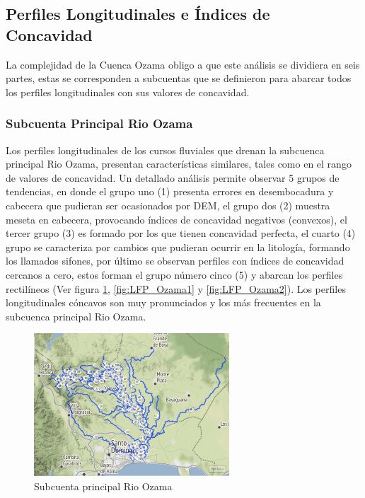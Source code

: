 \documentclass[11pt,]{article}
\begin{document}
\subsection{Perfiles Longitudinales e Índices de
Concavidad}\label{perfiles-longitudinales-e-uxedndices-de-concavidad}

La complejidad de la Cuenca Ozama obligo a que este análisis se
dividiera en seis partes, estas se corresponden a subcuentas que se
definieron para abarcar todos los perfiles longitudinales con sus
valores de concavidad.

\subsubsection{Subcuenta Principal Rio
Ozama}\label{subcuenta-principal-rio-ozama}

Los perfiles longitudinales de los cursos fluviales que drenan la
subcuenca principal Rio Ozama, presentan características similares,
tales como en el rango de valores de concavidad. Un detallado análisis
permite observar 5 grupos de tendencias, en donde el grupo uno (1)
presenta errores en desembocadura y cabecera que pudieran ser
ocasionados por DEM, el grupo dos (2) muestra meseta en cabecera,
provocando índices de concavidad negativos (convexos), el tercer grupo
(3) es formado por los que tienen concavidad perfecta, el cuarto (4)
grupo se caracteriza por cambios que pudieran ocurrir en la litología,
formando los llamados sifones, por último se observan perfiles con
índices de concavidad cercanos a cero, estos forman el grupo número
cinco (5) y abarcan los perfiles rectilíneos (Ver figura
\ref{fig:LFP_Ozama0}, \ref{fig:LFP_Ozama1} y \ref{fig:LFP_Ozama2}). Los
perfiles longitudinales cóncavos son muy pronunciados y los más
frecuentes en la subcuenca principal Rio Ozama.

\begin{figure}
\centering
\includegraphics[width=0.65000\textwidth]{Productos Generados/Perfil1.png}
\caption{\label{fig:LFP_Ozama0} Subcuenta principal Rio Ozama}
\end{figure}
\end{document}
